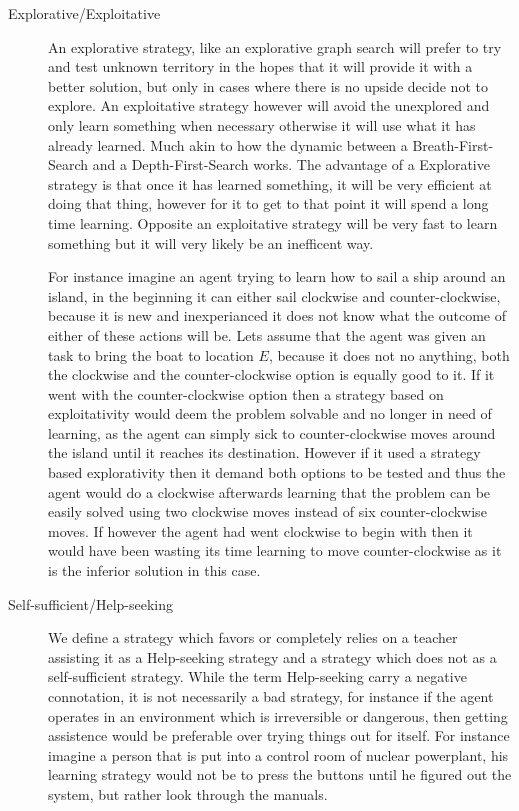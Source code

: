 \documentclass[Master.tex]{subfiles}
\begin{document}
    \begin{description}
    \item [{Explorative/Exploitative}] An explorative strategy, like an explorative graph search will prefer to try and test unknown territory in the hopes that it will provide it with a better solution, but only in cases where there is no upside decide not to explore.
    An exploitative strategy however will avoid the unexplored and only learn something when necessary otherwise it will use what it has already learned. Much akin to how the dynamic between a Breath-First-Search and a Depth-First-Search works. The advantage of a Explorative strategy is that once it has learned something, it will be very efficient at doing that thing, however for it to get to that point it will spend a long time learning. Opposite an exploitative strategy will be very fast to learn something but it will very likely be an inefficent way.

    For instance imagine an agent trying to learn how to sail a ship around an island, in the beginning it can either sail clockwise and counter-clockwise, because it is new and inexperianced it does not know what the outcome of either of these actions will be. Lets assume that the agent was given an task to bring the boat to location $ E $, because it does not no anything, both the clockwise and the counter-clockwise option is equally good to it. If it went with the counter-clockwise option then a strategy based on exploitativity would deem the problem solvable and no longer in need of learning, as the agent can simply sick to counter-clockwise moves around the island until it reaches its destination. However if it used a strategy based explorativity then it demand both options to be tested and thus the agent would do a clockwise afterwards learning that the problem can be easily solved using two clockwise moves instead of six counter-clockwise moves. If however the agent had went clockwise to begin with then it would have been wasting its time learning to move counter-clockwise as it is the inferior solution in this case.
    \item [{Self-sufficient/Help-seeking}] We define a strategy which favors
    or completely relies on a teacher assisting it as a Help-seeking strategy
    and a strategy which does not as a self-sufficient strategy. While
    the term Help-seeking carry a negative connotation, it is not necessarily
    a bad strategy, for instance if the agent operates in an environment
    which is irreversible or dangerous, then getting assistence would
    be preferable over trying things out for itself. For instance imagine
    a person that is put into a control room of nuclear powerplant, his
    learning strategy would not be to press the buttons until he figured
    out the system, but rather look through the manuals.

    \end{description}
\end{document}
